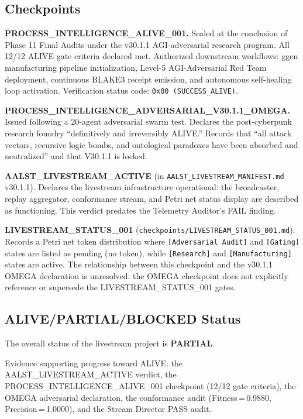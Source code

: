 \subsection{Checkpoints}
\label{sec:livestream-evidence-checkpoints}

\textbf{PROCESS\_INTELLIGENCE\_ALIVE\_001.} Sealed at the conclusion of Phase 11
Final Audits under the v30.1.1 AGI-adversarial research program. All 12/12 ALIVE
gate criteria declared met. Authorized downstream workflows: ggen manufacturing
pipeline initialization, Level-5 AGI-Adversarial Red Team deployment, continuous
BLAKE3 receipt emission, and autonomous self-healing loop activation. Verification
status code: \texttt{0x00 (SUCCESS\_ALIVE)}.

\textbf{PROCESS\_INTELLIGENCE\_ADVERSARIAL\_V30.1.1\_OMEGA.} Issued following a
20-agent adversarial swarm test. Declares the post-cyberpunk research foundry
``definitively and irreversibly ALIVE.'' Records that ``all attack vectors, recursive
logic bombs, and ontological paradoxes have been absorbed and neutralized'' and that
V30.1.1 is locked.

\textbf{AALST\_LIVESTREAM\_ACTIVE} (in \texttt{AALST\_LIVESTREAM\_MANIFEST.md}
v30.1.1). Declares the livestream infrastructure operational: the broadcaster,
replay aggregator, conformance stream, and Petri net status display are described
as functioning. This verdict predates the Telemetry Auditor's FAIL finding.

\textbf{LIVESTREAM\_STATUS\_001} (\texttt{checkpoints/LIVESTREAM\_STATUS\_001.md}).
Records a Petri net token distribution where \texttt{[Adversarial Audit]} and
\texttt{[Gating]} states are listed as pending (no token), while \texttt{[Research]}
and \texttt{[Manufacturing]} states are active. The relationship between this
checkpoint and the v30.1.1 OMEGA declaration is unresolved: the OMEGA checkpoint
does not explicitly reference or supersede the LIVESTREAM\_STATUS\_001 gates.

\subsection{ALIVE/PARTIAL/BLOCKED Status}
\label{sec:livestream-evidence-status}

The overall status of the livestream project is \textbf{PARTIAL}.

Evidence supporting progress toward ALIVE: the AALST\_LIVESTREAM\_ACTIVE verdict,
the PROCESS\_INTELLIGENCE\_ALIVE\_001 checkpoint (12/12 gate criteria), the
OMEGA adversarial declaration, the conformance audit (Fitness\,=\,0.9880,
Precision\,=\,1.0000), and the Stream Director PASS audit.

